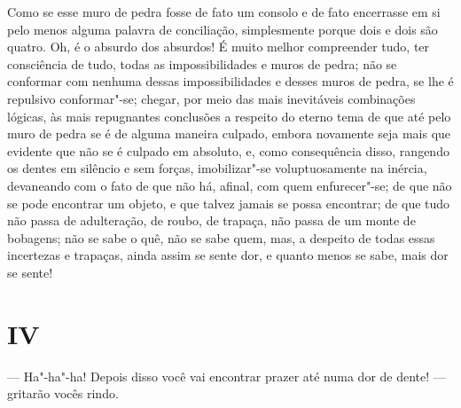 Como se esse muro de pedra fosse de fato um consolo e de fato encerrasse
em si pelo menos alguma palavra de conciliação, simplesmente porque
dois e dois são quatro. Oh, é o absurdo dos absurdos! É muito melhor
compreender tudo, ter consciência de tudo, todas as impossibilidades e
muros de pedra; não se conformar com nenhuma dessas impossibilidades e
desses muros de pedra, se lhe é repulsivo conformar"-se; chegar, por
meio das mais inevitáveis combinações lógicas, às mais repugnantes
conclusões a respeito do eterno tema de que até pelo muro de pedra se é
de alguma maneira culpado, embora novamente seja mais que evidente que
não se é culpado em absoluto, e, como consequência disso, rangendo os
dentes em silêncio e sem forças, imobilizar"-se voluptuosamente na
inércia, devaneando com o fato de que não há, afinal, com quem
enfurecer"-se; de que não se pode encontrar um objeto, e que talvez
jamais se possa encontrar; de que tudo não passa de adulteração, de
roubo, de trapaça, não passa de um monte de bobagens; não se sabe o
quê, não se sabe quem, mas, a despeito de todas essas incertezas e
trapaças, ainda assim se sente dor, e quanto menos se sabe, mais dor se
sente!


\section{IV}

--- Ha"-ha"-ha! Depois disso você vai encontrar prazer até numa dor de
dente! --- gritarão vocês rindo.

